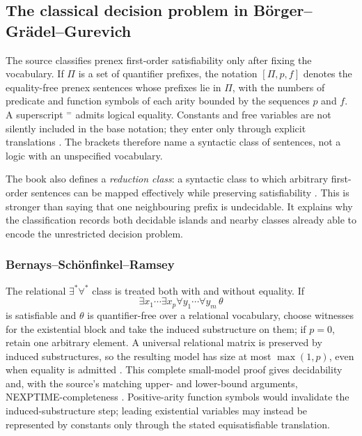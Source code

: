 
\subsection{The classical decision problem in B\"orger--Gr\"adel--Gurevich}
\label{sec:p09-presentation-n-c-005}

The source classifies prenex first-order satisfiability only after fixing the
vocabulary.  If \(\Pi\) is a set of quantifier prefixes, the notation
\([\Pi,p,f]\) denotes the equality-free prenex sentences whose prefixes lie
in \(\Pi\), with the numbers of predicate and function symbols of each arity
bounded by the sequences \(p\) and \(f\).  A superscript \({}^{=}\) admits
logical equality.  Constants and free variables are not silently included in
the base notation; they enter only through explicit translations
\cite[def.~1.3.1]{BorgerGradelGurevich1997}.  The brackets therefore name a
syntactic class of sentences, not a logic with an unspecified vocabulary.

The book also defines a \emph{reduction class}: a syntactic class to which
arbitrary first-order sentences can be mapped effectively while preserving
satisfiability \cite[def.~2.1.6]{BorgerGradelGurevich1997}.  This is stronger
than saying that one neighbouring prefix is undecidable.  It explains why the
classification records both decidable islands and nearby classes already able
to encode the unrestricted decision problem.

\subsubsection{Bernays--Sch\"onfinkel--Ramsey}

The relational \(\exists^*\forall^*\) class is treated both with and without
equality.  If
\[
 \exists x_1\cdots\exists x_p
 \forall y_1\cdots\forall y_m\,\theta
\]
is satisfiable and \(\theta\) is quantifier-free over a relational vocabulary,
choose witnesses for the existential block and take the induced substructure
on them; if \(p=0\), retain one arbitrary element.  A universal relational
matrix is preserved by induced substructures, so the resulting model has size
at most \(\max(1,p)\), even when equality is admitted
\cite[prop.~6.2.17]{BorgerGradelGurevich1997}.  This complete small-model proof
gives decidability and, with the source's matching upper- and lower-bound
arguments, NEXPTIME-completeness \cite[pp.~257--261]{BorgerGradelGurevich1997}.
Positive-arity function symbols would invalidate the induced-substructure
step; leading existential variables may instead be represented by constants
only through the stated equisatisfiable translation.

